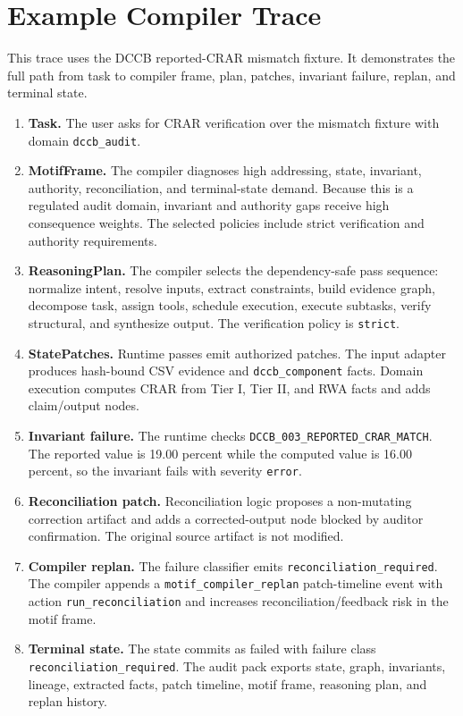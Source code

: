\documentclass[11pt]{article}
\begin{document}
\section{Example Compiler Trace}

This trace uses the DCCB reported-CRAR mismatch fixture. It demonstrates the full path from task to compiler frame, plan, patches, invariant failure, replan, and terminal state.

\begin{enumerate}[leftmargin=1.5em]
  \item \textbf{Task.} The user asks for CRAR verification over the mismatch fixture with domain \texttt{dccb\_audit}.
  \item \textbf{MotifFrame.} The compiler diagnoses high addressing, state, invariant, authority, reconciliation, and terminal-state demand. Because this is a regulated audit domain, invariant and authority gaps receive high consequence weights. The selected policies include strict verification and authority requirements.
  \item \textbf{ReasoningPlan.} The compiler selects the dependency-safe pass sequence: normalize intent, resolve inputs, extract constraints, build evidence graph, decompose task, assign tools, schedule execution, execute subtasks, verify structural, and synthesize output. The verification policy is \texttt{strict}.
  \item \textbf{StatePatches.} Runtime passes emit authorized patches. The input adapter produces hash-bound CSV evidence and \texttt{dccb\_component} facts. Domain execution computes CRAR from Tier I, Tier II, and RWA facts and adds claim/output nodes.
  \item \textbf{Invariant failure.} The runtime checks \texttt{DCCB\_003\_REPORTED\_CRAR\_MATCH}. The reported value is 19.00 percent while the computed value is 16.00 percent, so the invariant fails with severity \texttt{error}.
  \item \textbf{Reconciliation patch.} Reconciliation logic proposes a non-mutating correction artifact and adds a corrected-output node blocked by auditor confirmation. The original source artifact is not modified.
  \item \textbf{Compiler replan.} The failure classifier emits \texttt{reconciliation\_required}. The compiler appends a \texttt{motif\_compiler\_replan} patch-timeline event with action \texttt{run\_reconciliation} and increases reconciliation/feedback risk in the motif frame.
  \item \textbf{Terminal state.} The state commits as failed with failure class \texttt{reconciliation\_required}. The audit pack exports state, graph, invariants, lineage, extracted facts, patch timeline, motif frame, reasoning plan, and replan history.
\end{enumerate}
\end{document}
